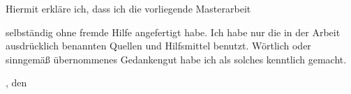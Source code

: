 Hiermit erkläre ich, dass ich die vorliegende Masterarbeit
\begin{quote}
\textbf{\titel}   
\end{quote}

selbständig ohne fremde Hilfe angefertigt habe.
Ich habe nur die in der Arbeit ausdrücklich benannten Quellen und Hilfsmittel benutzt. 
Wörtlich oder sinngemäß übernommenes Gedankengut habe ich als solches kenntlich gemacht.

\vspace{6em}
\ort, den \datumAbgabe \hfill \autor 


